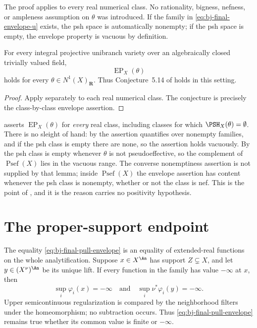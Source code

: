The proof applies to every real numerical class.
No rationality, bigness, nefness, or ampleness assumption on $\theta$ was
introduced.
If the family in \eqref{eq:bj-final-envelope-u} exists, the psh space is
automatically nonempty; if the psh space is empty, the envelope property is
vacuous by definition.

\begin{corollary}\label{cor:bj-conjecture-514}
For every integral projective unibranch variety over an algebraically closed
trivially valued field,
\[
                         \operatorname{EP}_X(\theta)
\]
holds for every $\theta\in N^1(X)_{\mathbf R}$.
Thus Conjecture~5.14 of \cite{BJ22} holds in this setting.
\end{corollary}

\begin{proof}
Apply  separately to each real numerical class.
The conjecture is precisely the class-by-class envelope assertion.
\end{proof}

\begin{remark}
\label{rem:ch45-empty-case}
 asserts $\operatorname{EP}_X(\theta)$ for
\emph{every} real class, including classes for which
$\PSH_X(\theta)=\emptyset$.  There is no sleight of hand: by
 the assertion quantifies over nonempty
families, and if the psh class is empty there are none, so the assertion
holds vacuously.  By  the psh class is empty
whenever $\theta$ is not pseudoeffective, so the complement of
$\operatorname{Psef}(X)$ lies in the vacuous range.  The converse
nonemptiness assertion is not supplied by that lemma; inside
$\operatorname{Psef}(X)$ the envelope assertion has content whenever the
psh class is nonempty, whether or not the class is nef.  This is the point of
, and it is the reason
 carries no positivity hypothesis.
\end{remark}

\section{The proper-support endpoint}
\label{sec:ch45-endpoint}

The equality \eqref{eq:bj-final-pull-envelope} is an equality of
extended-real functions on the whole analytification.
Suppose $x\in X^{\An}$ has support $Z\subsetneq X$, and let
$y\in(X^\nu)^{\An}$ be its unique lift.
If every function in the family has value $-\infty$ at $x$, then
\[
           \sup_i\varphi_i(x)=-\infty
           \quad\text{and}\quad
           \sup_i\nu^*\varphi_i(y)=-\infty.
\]
Upper semicontinuous regularization is compared by the neighborhood filters
under the homeomorphism; no subtraction occurs.
Thus \eqref{eq:bj-final-pull-envelope} remains true whether its common value
is finite or $-\infty$.

